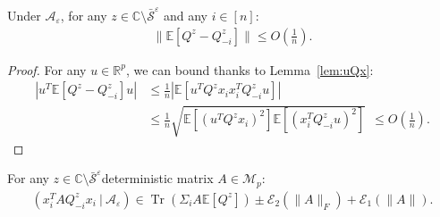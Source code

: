 \documentclass{ws-rmta}
\DeclareMathOperator{\tr}{Tr}
\begin{document}
\begin{lemma}\label{lem:Q_m_Q_m_i}
  Under $\mathcal A_\varepsilon$, for any $z \in \mathbb C \setminus \bar{\mathcal S}^\varepsilon$ and any $i \in [n]$:
  \begin{align*}
    \|\mathbb E[Q^z - Q^z_{-i}]\| \leq O \left( \frac{1}{n} \right).
  \end{align*}
\end{lemma}
\begin{proof}
  For any $u \in \mathbb R^p$, we can bound thanks to Lemma~\ref{lem:uQx}:
  \begin{align*}
    \left\vert u^T \mathbb E[Q^z - Q^z_{-i}]u \right\vert
    &\leq  \frac{1}{n}\left\vert  \mathbb E \left[ u^TQ^zx_ix_i^TQ^z_{-i}u \right] \right\vert \\
    &\leq  \frac{1}{n}\sqrt{\mathbb E \left[ (u^TQ^zx_i)^2\right]\mathbb E \left[ (x_i^TQ^z_{-i}u)^2 \right] } \ \ \leq O \left( \frac{1}{n} \right).
  \end{align*}
\end{proof}

\begin{lemma}\label{lem:concentration xQx}
  For any $z \in  \mathbb C \setminus \bar{\mathcal S}^\varepsilon $deterministic matrix $A \in \mathcal{M}_{p}$:
  \begin{align*}
     (x_i^T AQ^z_{-i}x_i \ | \ \mathcal A_\varepsilon) \in \tr(\Sigma_i A\mathbb E[Q^z]) \pm\mathcal E_2 \left( \|A\|_F \right) + \mathcal E_1(\|A\|).
  \end{align*} 
\end{lemma}
\end{document}
